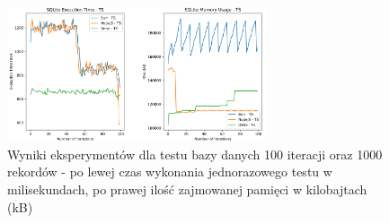 \begin{figure}[H]
  \centering
  \includegraphics[width=0.68\textwidth]{Figures/database/sqlite_100_1000_ts.png}
  \caption{Wyniki eksperymentów dla testu bazy danych 100 iteracji oraz 1000 rekordów - po lewej czas wykonania jednorazowego testu w milisekundach, po prawej ilość zajmowanej pamięci w kilobajtach (kB)}
  \label{fig:database_e2_ts}
\end{figure}